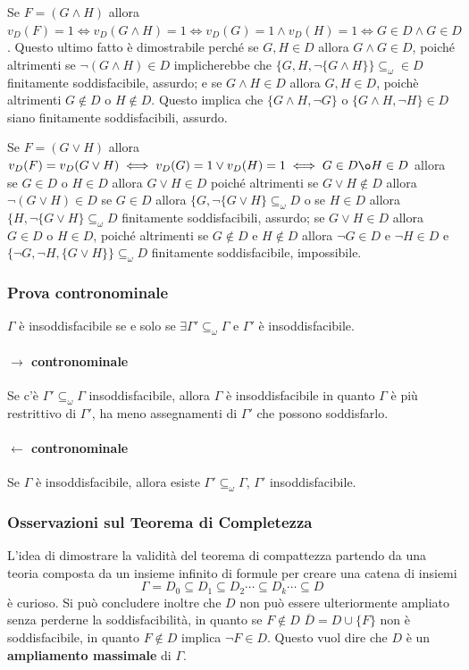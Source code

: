 Se $F = (G \land H)$ allora $v_D(F) = 1 \iff v_D(G \land H) = 1 \iff v_D(G) = 1 \land v_D(H) = 1\iff G \in D \land G \in D$. Questo ultimo fatto è dimostrabile perché se $G, H \in D$ allora 
$G \land G \in D$, poiché altrimenti se $\neg(G \land H) \in D$ implicherebbe 
che $\{G, H, \neg \{G \land H\}\} \subseteq_{\omega} \in D$ finitamente 
soddisfacibile, assurdo; e se $G\land H \in D $ allora $G, H \in D$, poichè altrimenti 
$G \notin D$ o $H \notin D$. Questo implica che $\{G\land H, \neg G\}$ 
o $\{G\land H, \neg H\} \in D$ siano finitamente soddisfacibili, assurdo. 
 
Se $F = (G \lor H)$ allora $v_D(F) = v_D(G \lor H) \iff v_D(G) = 1 \lor v_D(H) = 1 \iff G \in D \o H \in D$
allora se $G \in D$ o $H \in D$ allora $G \lor H \in D$ poiché altrimenti 
se $G \lor H \notin D$ allora $\neg (G \lor H) \in D$ se $G \in D$ allora 
$\{G, \neg \{G \lor H \} \subseteq_{\omega} D$
o se $H \in D$ allora $\{H, \neg \{G \lor H\} \subseteq_{\omega} D$ finitamente 
soddisfacibili, assurdo; se $G \lor H \in D$ allora $G \in D$ o $H \in D$, 
poiché altrimenti se $G \notin D$ e $H \notin D$ allora $\neg G \in D $ e 
$\neg H \in D$ e $\{\neg G, \neg H, \{G \lor H \}\} \subseteq_{\omega} D$ 
finitamente soddisfacibile, impossibile. 

\subsubsection{Prova contronominale}
$\Gamma$ è insoddisfacibile se 
e solo se $\exists \Gamma' \subseteq_{\omega} \Gamma$ e $\Gamma'$ è 
insoddisfacibile. 
\paragraph{$\rightarrow$ contronominale} 
Se c'è $\Gamma' \subseteq_{\omega} \Gamma$ insoddisfacibile, allora $\Gamma$ 
è insoddisfacibile in quanto $\Gamma$ è più restrittivo di $\Gamma'$, ha 
meno assegnamenti di $\Gamma'$ che possono soddisfarlo. 

\paragraph{$\leftarrow$ contronominale}
Se $\Gamma$ è insoddisfacibile, allora esiste $\Gamma' \subseteq_{\omega} \Gamma$, 
$\Gamma'$ insoddisfacibile. 

\subsubsection{Osservazioni sul Teorema di Completezza}
L'idea di dimostrare la validità del teorema di compattezza partendo 
da una teoria composta da un insieme infinito di formule per creare una catena 
di insiemi 
$$
\Gamma = D_0 \subseteq D_1 \subseteq D_2 \cdots \subseteq D_k \cdots \subseteq D
$$
è curioso. Si può concludere inoltre che $D$ non può essere ulteriormente ampliato 
senza perderne la soddisfacibilità, in quanto se $F \notin D$ $\overline{D} = D \cup \{F\}$ 
non è soddisfacibile, in quanto $F \notin D$ implica $\neg F \in D$.
Questo vuol dire che $D$ è un \textbf{ampliamento massimale} di $\Gamma$. 

